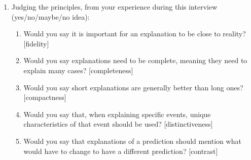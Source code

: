 \begin{enumerate}
    \item Judging the principles, from your experience during this interview (yes/no/maybe/no idea): \begin{enumerate}
        \item Would you say it is important for an explanation to be close to reality? [fidelity]
        \item Would you say explanations need to be complete, meaning they need to explain many cases? [completeness]
        \item Would you say short explanations are generally better than long ones? [compactness]
        \item Would you say that, when explaining specific events, unique characteristics of that event should be used? [distinctiveness]
        \item Would you say that explanations of a prediction should mention what would have to change to have a different prediction? [contrast]
    \end{enumerate}
\end{enumerate}